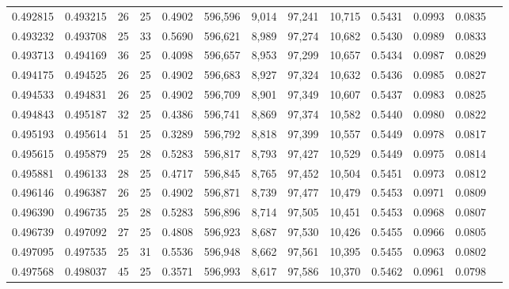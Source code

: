\begin{tabular}{rrrrrrrrrrrrr}
0.492815 & 0.493215 &    26 &  25 &                                     0.4902 & 596,596 &   9,014 &  97,241 &  10,715 & 0.5431 & 0.0993 & 0.0835 \\
0.493232 & 0.493708 &    25 &  33 &                                     0.5690 & 596,621 &   8,989 &  97,274 &  10,682 & 0.5430 & 0.0989 & 0.0833 \\
0.493713 & 0.494169 &    36 &  25 &                                     0.4098 & 596,657 &   8,953 &  97,299 &  10,657 & 0.5434 & 0.0987 & 0.0829 \\
0.494175 & 0.494525 &    26 &  25 &                                     0.4902 & 596,683 &   8,927 &  97,324 &  10,632 & 0.5436 & 0.0985 & 0.0827 \\
0.494533 & 0.494831 &    26 &  25 &                                     0.4902 & 596,709 &   8,901 &  97,349 &  10,607 & 0.5437 & 0.0983 & 0.0825 \\
0.494843 & 0.495187 &    32 &  25 &                                     0.4386 & 596,741 &   8,869 &  97,374 &  10,582 & 0.5440 & 0.0980 & 0.0822 \\
0.495193 & 0.495614 &    51 &  25 &                                     0.3289 & 596,792 &   8,818 &  97,399 &  10,557 & 0.5449 & 0.0978 & 0.0817 \\
0.495615 & 0.495879 &    25 &  28 &                                     0.5283 & 596,817 &   8,793 &  97,427 &  10,529 & 0.5449 & 0.0975 & 0.0814 \\
0.495881 & 0.496133 &    28 &  25 &                                     0.4717 & 596,845 &   8,765 &  97,452 &  10,504 & 0.5451 & 0.0973 & 0.0812 \\
0.496146 & 0.496387 &    26 &  25 &                                     0.4902 & 596,871 &   8,739 &  97,477 &  10,479 & 0.5453 & 0.0971 & 0.0809 \\
0.496390 & 0.496735 &    25 &  28 &                                     0.5283 & 596,896 &   8,714 &  97,505 &  10,451 & 0.5453 & 0.0968 & 0.0807 \\
0.496739 & 0.497092 &    27 &  25 &                                     0.4808 & 596,923 &   8,687 &  97,530 &  10,426 & 0.5455 & 0.0966 & 0.0805 \\
0.497095 & 0.497535 &    25 &  31 &                                     0.5536 & 596,948 &   8,662 &  97,561 &  10,395 & 0.5455 & 0.0963 & 0.0802 \\
0.497568 & 0.498037 &    45 &  25 &                                     0.3571 & 596,993 &   8,617 &  97,586 &  10,370 & 0.5462 & 0.0961 & 0.0798 \\

\end{tabular}
